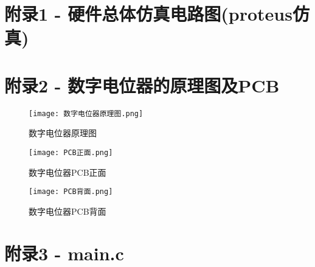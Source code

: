 \documentclass[lang=cn,11pt,a4paper]{elegantpaper}
\begin{document}
\begin{appendices}
  \section{附录1 - 硬件总体仿真电路图(proteus仿真)}
  

  \section{附录2 - 数字电位器的原理图及PCB}
  \begin{figure}[!htb]
    \centering
    \texttt{[image: 数字电位器原理图.png]}
    \caption{数字电位器原理图}
    \label{fig:数字电位器原理图}
  \end{figure}

  \begin{figure}[H]
    \centering
    \texttt{[image: PCB正面.png]}
    \caption{数字电位器PCB正面}
    \label{fig:PCB正面}
  \end{figure}

  \begin{figure}[H]
    \centering
    \texttt{[image: PCB背面.png]}
    \caption{数字电位器PCB背面}
    \label{fig:PCB背面}
  \end{figure}

  \section{附录3 - main.c}
  
\end{appendices}
\end{document}
